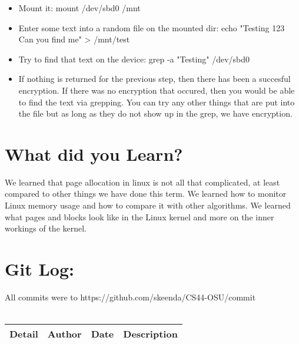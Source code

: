 \documentclass[10pt,drafclsnofoot,onecolumn]{article}
\begin{document}
\begin{itemize}
\item Mount it: mount /dev/sbd0 /mnt
\item Enter some text into a random file on the mounted dir: echo "Testing 123 Can you find me" > /mnt/test
\item Try to find that text on the device: grep -a "Testing" /dev/sbd0
\item If nothing is returned for the previous step, then there has been a succesful encryption. If there was no encryption that occured, then you would be able to find the text via grepping. You can try any other things that are put into the file but as long as they do not show up in the grep, we have encryption.

\end{itemize}

\section{What did you Learn?}
We learned that page allocation in linux is not all that complicated, at least compared to other things we have done this term.
We learned how to monitor Linux memory usage and how to compare it with other algorithms.
We learned what pages and blocks look like in the Linux kernel and more on the inner workings of the kernel.

\section{Git Log:}
All commits were to https://github.com/skeenda/CS44-OSU/commit\\
\\
\begin{tabular}{|p{1.5cm}|p{2cm}|p{5cm}|p{7cm}|}
\textbf{Detail} & \textbf{Author} & \textbf{Date} & \textbf{Description}\\\hline

\end{tabular}



\end{document}
